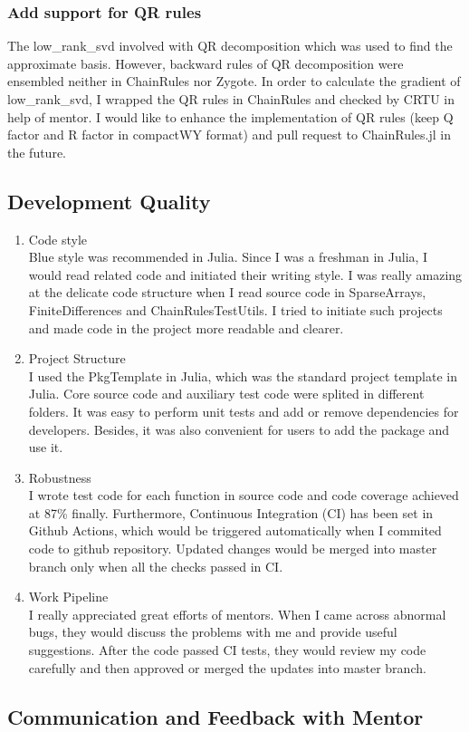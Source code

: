 \subsubsection{Add support for QR rules}
The low\_rank\_svd involved with QR decomposition which was used to find the approximate basis. 
However, backward rules of QR decomposition were ensembled neither in ChainRules nor Zygote. In order to 
calculate the gradient of low\_rank\_svd, I wrapped the QR rules in ChainRules and checked by CRTU in help of mentor. 
I would like to enhance the implementation of QR rules (keep Q factor and R factor in compactWY format) and pull request to 
ChainRules.jl in the future. 
\subsection{Development Quality}
\begin{enumerate}
    \item Code style  \\
    Blue style was recommended in Julia. Since I was a freshman in Julia, I
    would read related code and initiated their writing style. I was really amazing at 
    the delicate code structure when I read source code in SparseArrays, FiniteDifferences 
    and ChainRulesTestUtils. I tried to initiate such projects and made code in the project more 
    readable and clearer.   
    \item Project Structure \\
    I used the PkgTemplate in Julia, which was the standard project template in Julia. 
    Core source code and auxiliary test code were splited in different folders. It was easy to 
    perform unit tests and add or remove dependencies for developers. Besides, it was also 
    convenient for users to add the package and use it. 
    \item Robustness \\
    I wrote test code for each function in source code and code coverage achieved at 87\% finally. Furthermore, Continuous Integration (CI)
    has been set in Github Actions, which would be triggered automatically when I commited code to 
    github repository. Updated changes would be merged into master branch only when all the checks 
    passed in CI.   
    \item Work Pipeline \\
    I really appreciated great efforts of mentors. When I came across abnormal bugs, they would discuss the problems with me 
    and provide useful suggestions. After the code passed CI tests, they would review my code carefully and then approved or merged the 
    updates into master branch. 
\end{enumerate}
\subsection{Communication and Feedback with Mentor}

